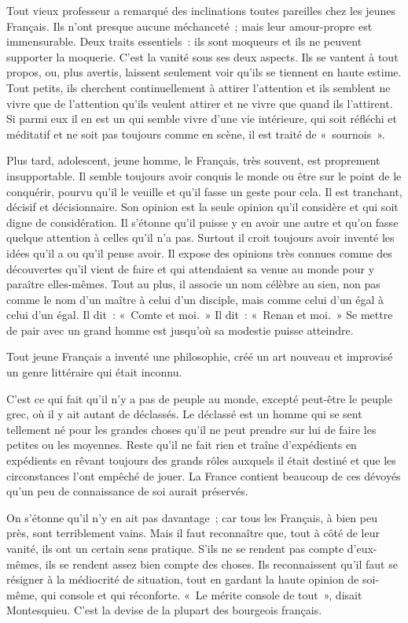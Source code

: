 \documentclass[french,twoside]{book} %
\begin{document}
Tout vieux professeur a remarqué des inclinations toutes pareilles chez les jeunes Français. Ils n’ont presque aucune méchanceté ; mais leur amour-propre est immensurable. Deux traits essentiels : ils sont moqueurs et ils ne peuvent supporter la moquerie. C’est la vanité sous ses deux aspects. Ils se vantent à tout propos, ou, plus avertis, laissent seulement voir qu’ils se tiennent en haute estime. Tout petits, ils cherchent continuellement à attirer l’attention et ils semblent ne vivre que de l’attention qu’ils veulent attirer et ne vivre que quand ils l’attirent. Si parmi eux il en est un qui semble vivre d’une vie intérieure, qui soit réfléchi et méditatif et ne soit pas toujours comme en scène, il est traité de « sournois ».\par
Plus tard, adolescent, jeune homme, le Français, très souvent, est proprement insupportable. Il semble toujours avoir conquis le monde ou être sur le point de le conquérir, pourvu qu’il le veuille et qu’il fasse un geste pour cela. Il est tranchant, décisif et décisionnaire. Son opinion est la seule opinion qu’il considère et qui soit digne de considération. Il s’étonne qu’il puisse y en avoir une autre et qu’on fasse quelque attention à celles qu’il n’a pas. Surtout il croit toujours avoir inventé les  idées qu’il a ou qu’il pense avoir. Il expose des opinions très connues comme des découvertes qu’il vient de faire et qui attendaient sa venue au monde pour y paraître elles-mêmes. Tout au plus, il associe un nom célèbre au sien, non pas comme le nom d’un maître à celui d’un disciple, mais comme celui d’un égal à celui d’un égal. Il dit : « Comte et moi. » Il dit : « Renan et moi. » Se mettre de pair avec un grand homme est jusqu’où sa modestie puisse atteindre.\par
Tout jeune Français a inventé une philosophie, créé un art nouveau et improvisé un genre littéraire qui était inconnu.\par
C’est ce qui fait qu’il n’y a pas de peuple au monde, excepté peut-être le peuple grec, où il y ait autant de déclassés. Le déclassé est un homme qui se sent tellement né pour les grandes choses qu’il ne peut prendre sur lui de faire les petites ou les moyennes. Reste qu’il ne fait rien et traîne d’expédients en expédients en rêvant toujours des grands rôles auxquels il était destiné et que les circonstances l’ont empêché de jouer. La France contient beaucoup de ces dévoyés qu’un peu de connaissance de soi aurait préservés.\par
On s’étonne qu’il n’y en ait pas davantage ; car tous les Français, à bien peu près, sont terriblement vains. Mais il faut reconnaître que, tout à  côté de leur vanité, ils ont un certain sens pratique. S’ils ne se rendent pas compte d’eux-mêmes, ils se rendent assez bien compte des choses. Ils reconnaissent qu’il faut se résigner à la médiocrité de situation, tout en gardant la haute opinion de soi-même, qui console et qui réconforte. « Le mérite console de tout », disait Montesquieu. C’est la devise de la plupart des bourgeois français.\par
\end{document}
